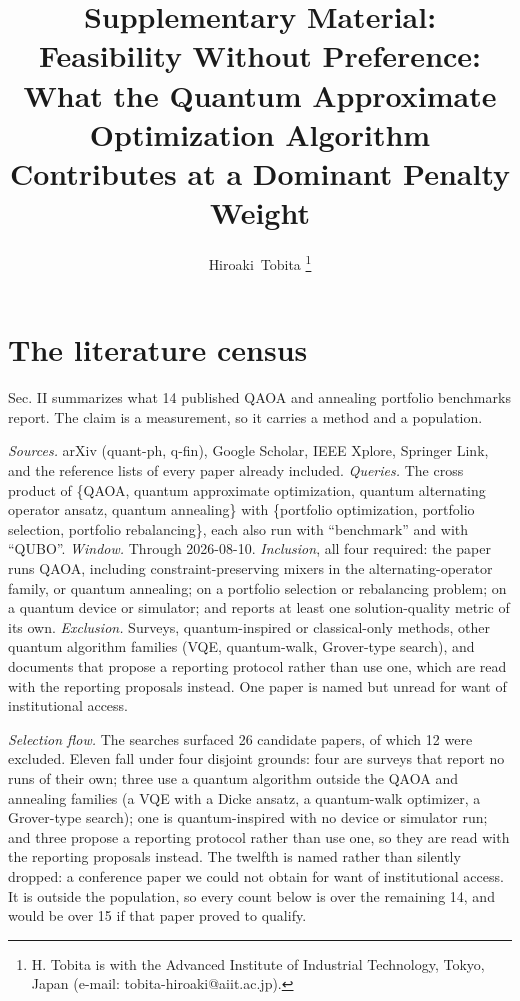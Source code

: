 \documentclass[journal]{IEEEtran}
\begin{document}
\title{Supplementary Material: Feasibility Without Preference: What the Quantum Approximate Optimization Algorithm Contributes at a Dominant Penalty Weight}

\author{Hiroaki~Tobita%
\thanks{H. Tobita is with the Advanced Institute of Industrial Technology,
Tokyo, Japan (e-mail: tobita-hiroaki@aiit.ac.jp).}}

\maketitle



\section{The literature census}


Sec. II summarizes what 14 published QAOA and annealing portfolio benchmarks report. The claim is a measurement, so it carries a method and a population.


\textit{Sources.} arXiv (quant-ph, q-fin), Google Scholar, IEEE Xplore, Springer Link, and the reference lists of every paper already included. \textit{Queries.} The cross product of \{QAOA, quantum approximate optimization, quantum alternating operator ansatz, quantum annealing\} with \{portfolio optimization, portfolio selection, portfolio rebalancing\}, each also run with ``benchmark'' and with ``QUBO''. \textit{Window.} Through 2026-08-10. \textit{Inclusion}, all four required: the paper runs QAOA, including constraint-preserving mixers in the alternating-operator family, or quantum annealing; on a portfolio selection or rebalancing problem; on a quantum device or simulator; and reports at least one solution-quality metric of its own. \textit{Exclusion.} Surveys, quantum-inspired or classical-only methods, other quantum algorithm families (VQE, quantum-walk, Grover-type search), and documents that propose a reporting protocol rather than use one, which are read with the reporting proposals instead. One paper is named but unread for want of institutional access.


\textit{Selection flow.} The searches surfaced 26 candidate papers, of which 12 were excluded. Eleven fall under four disjoint grounds: four are surveys that report no runs of their own; three use a quantum algorithm outside the QAOA and annealing families (a VQE with a Dicke ansatz, a quantum-walk optimizer, a Grover-type search); one is quantum-inspired with no device or simulator run; and three propose a reporting protocol rather than use one, so they are read with the reporting proposals instead. The twelfth is named rather than silently dropped: a conference paper we could not obtain for want of institutional access. It is outside the population, so every count below is over the remaining 14, and would be over 15 if that paper proved to qualify.
\end{document}
